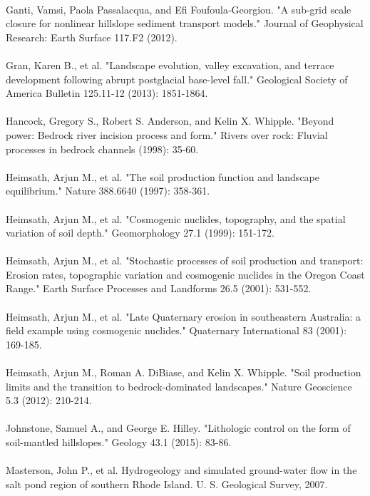 \documentclass[12pt]{article}
\begin{document}
{\\
\noindent
Ganti, Vamsi, Paola Passalacqua, and Efi Foufoula‐Georgiou. "A sub‐grid scale closure for nonlinear hillslope sediment transport models." Journal of Geophysical Research: Earth Surface 117.F2 (2012).
\\
\\
\noindent
Gran, Karen B., et al. "Landscape evolution, valley excavation, and terrace development following abrupt postglacial base-level fall." Geological Society of America Bulletin 125.11-12 (2013): 1851-1864.
\\
\\
\noindent
Hancock, Gregory S., Robert S. Anderson, and Kelin X. Whipple. "Beyond power: Bedrock river incision process and form." Rivers over rock: Fluvial processes in bedrock channels (1998): 35-60.
\\
\\
\noindent
Heimsath, Arjun M., et al. "The soil production function and landscape equilibrium." Nature 388.6640 (1997): 358-361.
\\
\\
\noindent
Heimsath, Arjun M., et al. "Cosmogenic nuclides, topography, and the spatial variation of soil depth." Geomorphology 27.1 (1999): 151-172.
\\
\\
\noindent
Heimsath, Arjun M., et al. "Stochastic processes of soil production and transport: Erosion rates, topographic variation and cosmogenic nuclides in the Oregon Coast Range." Earth Surface Processes and Landforms 26.5 (2001): 531-552.
\\
\\
\noindent
Heimsath, Arjun M., et al. "Late Quaternary erosion in southeastern Australia: a field example using cosmogenic nuclides." Quaternary International 83 (2001): 169-185.
\\
\\
\noindent
Heimsath, Arjun M., Roman A. DiBiase, and Kelin X. Whipple. "Soil production limits and the transition to bedrock-dominated landscapes." Nature Geoscience 5.3 (2012): 210-214.
\\
\\
\noindent
Johnstone, Samuel A., and George E. Hilley. "Lithologic control on the form of soil-mantled hillslopes." Geology 43.1 (2015): 83-86.
\\
\\
\noindent
Masterson, John P., et al. Hydrogeology and simulated ground-water flow in the salt pond region of southern Rhode Island. U. S. Geological Survey, 2007.
}
\end{document}
